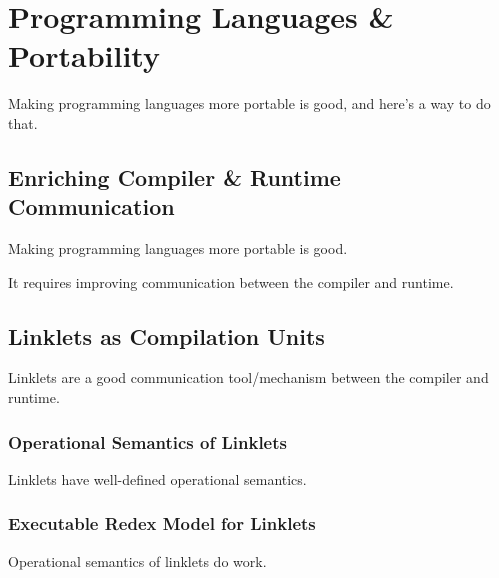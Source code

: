 \chapter{Programming Languages \& Portability}

\begin{mainpoint}

	Making programming languages more portable is good, and here's a way to do that.

\end{mainpoint}



\section{Enriching Compiler \& Runtime Communication}

\begin{mainpoint}
Making programming languages more portable is good.

It requires improving communication between the compiler and runtime.
\end{mainpoint}

\section{Linklets as Compilation Units}

\begin{mainpoint}
Linklets are a good communication tool/mechanism between the compiler and runtime.
\end{mainpoint}

\subsection{Operational Semantics of Linklets}

\begin{mainpoint}
Linklets have well-defined operational semantics.
\end{mainpoint}

\subsection{Executable Redex Model for Linklets}

\begin{mainpoint}
Operational semantics of linklets do work.
\end{mainpoint}


